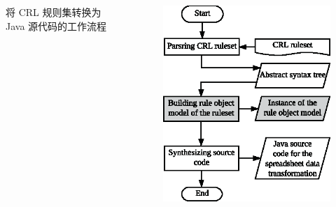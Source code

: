 \documentclass[10pt]{beamer}
\begin{document}
\begin{frame}
\begin{columns}[t]
\small 将 CRL 规则集转换为 Java 源代码的工作流程
\begin{figure}
\includegraphics[width=0.95\linewidth]{crl2j_wf_part2}
\end{figure}
\end{columns}
\end{frame}
\end{document}
